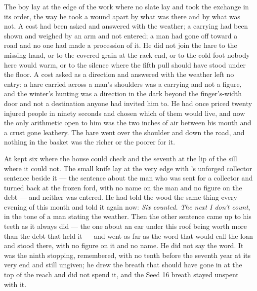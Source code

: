 The boy lay at the edge of the work where no slate lay and took the exchange in its order, the way he took a wound apart by what was there and by what was not. A cost had been asked and answered with the weather; a carrying had been shown and weighed by an arm and not entered; a man had gone off toward a road and no one had made a procession of it. He did not join the hare to the missing hand, or to the covered grain at the rack end, or to the cold foot nobody here would warm, or to the silence where the fifth pull should have stood under the floor. A cost asked as a direction and answered with the weather left no entry; a hare carried across a man's shoulders was a carrying and not a figure, and the winter's hunting was a direction in the dark beyond the finger's-width door and not a destination anyone had invited him to. He had once priced twenty injured people in ninety seconds and chosen which of them would live, and now the only arithmetic open to him was the two inches of air between his mouth and a crust gone leathery. The hare went over the shoulder and down the road, and nothing in the basket was the richer or the poorer for it.

\scenebreak

At   kept six where the house could check and the seventh at the lip of the sill where it could not. The small knife lay at the very edge with 's unforged collector sentence beside it --- the sentence about the man who was sent for a collector and turned back at the frozen ford, with no name on the man and no figure on the debt --- and neither was entered. He had told the wood the same thing every evening of this month and told it again now: \emph{Six counted. The next I don't count}, in the tone of a man stating the weather. Then the other sentence came up to his teeth as it always did --- the one about an ear under this roof being worth more than the debt that held it --- and went as far as the word that would call the loan and stood there, with no figure on it and no name. He did not say the word. It was the ninth stopping, remembered, with no tenth before the seventh year at its very end and still ungiven; he drew the breath that should have gone in at the top of the reach and did not spend it, and the Seed 16 breath stayed unspent with it.

